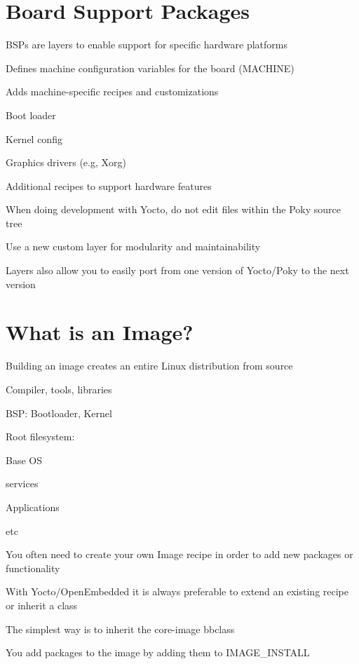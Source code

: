 \section*{Board Support Packages}


\begin{DoxyItemize}
\item B\+S\+Ps are layers to enable support for specific hardware platforms
\item Defines machine configuration variables for the board (M\+A\+C\+H\+I\+NE)
\item Adds machine-\/specific recipes and customizations
\begin{DoxyItemize}
\item Boot loader
\item Kernel config
\item Graphics drivers (e.\+g, Xorg)
\item Additional recipes to support hardware features
\end{DoxyItemize}
\item When doing development with Yocto, do not edit files within the Poky source tree
\item Use a new custom layer for modularity and maintainability
\item Layers also allow you to easily port from one version of Yocto/\+Poky to the next version
\end{DoxyItemize}

\section*{What is an Image?}


\begin{DoxyItemize}
\item Building an image creates an entire Linux distribution from source
\begin{DoxyItemize}
\item Compiler, tools, libraries
\item B\+SP\+: Bootloader, Kernel
\item Root filesystem\+:
\begin{DoxyItemize}
\item Base OS
\item services
\item Applications
\item etc
\end{DoxyItemize}
\end{DoxyItemize}
\item You often need to create your own Image recipe in order to add new packages or functionality
\item With Yocto/\+Open\+Embedded it is always preferable to extend an existing recipe or inherit a class
\item The simplest way is to inherit the core-\/image bbclass
\item You add packages to the image by adding them to I\+M\+A\+G\+E\+\_\+\+I\+N\+S\+T\+A\+LL
\end{DoxyItemize}


